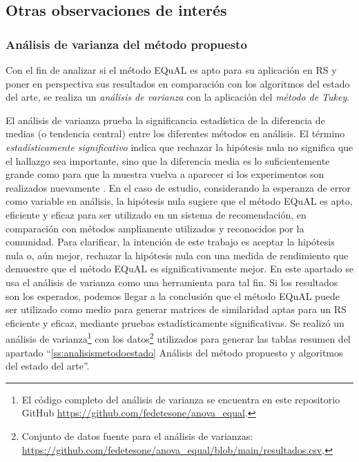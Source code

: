 \subsection{Otras observaciones de interés}

\subsubsection{Análisis de varianza del método propuesto}

Con el fin de analizar si el método EQuAL es apto para su aplicación en RS y poner en perspectiva sus resultados en comparación con los algoritmos del estado del arte, se realiza un \textit{análisis de varianza} con la aplicación del \textit{método de Tukey}.

\bigskip El análisis de varianza prueba la significancia estadística de la diferencia de medias (o tendencia central) entre los diferentes métodos en análisis. El término\textit{ estadísticamente significativo} indica que rechazar la hipótesis nula no significa que el hallazgo sea importante, sino que la diferencia media es lo suficientemente grande como para que la muestra vuelva a aparecer si los experimentos son realizados nuevamente \citep{tabachnick2007experimental}. En el caso de estudio, considerando la esperanza de error como variable en análisis, la hipótesis nula sugiere que el método EQuAL es apto, eficiente y eficaz para ser utilizado en un sistema de recomendación, en comparación con métodos ampliamente utilizados y reconocidos por la comunidad. Para clarificar, la intención de este trabajo es aceptar la hipótesis nula o, aún mejor, rechazar la hipótesis nula con una medida de rendimiento que demuestre que el método EQuAL es significativamente mejor. En este apartado se usa el análisis de varianza como una herramienta para tal fin. Si los resultados son los esperados, podemos llegar a la conclusión que el método EQuAL puede ser utilizado como medio para generar matrices de similaridad aptas para un RS eficiente y eficaz, mediante pruebas estadísticamente significativas. Se realizó un análisis de varianza\footnote{El código completo del análisis de varianza se encuentra en este repositorio GitHub \url{https://github.com/fedetesone/anova_equal}.} con los datos\footnote{Conjunto de datos fuente para el análisis de varianzas: \url{https://github.com/fedetesone/anova_equal/blob/main/resultados.csv}.} utilizados para generar las tablas resumen del apartado “\ref{ss:analisismetodoestado} Análisis del método propuesto y algoritmos del estado del arte”.

